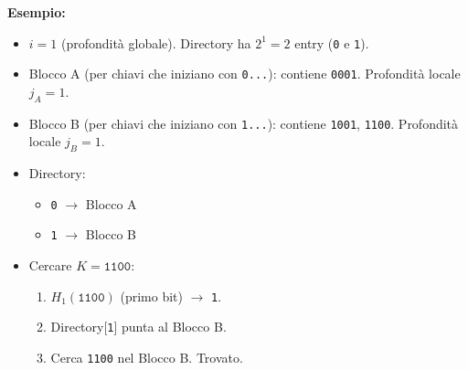 \textbf{Esempio:}
\begin{itemize}
    \item $i = 1$ (profondità globale). Directory ha $2^1 = 2$ entry (\texttt{0} e \texttt{1}).
    \item Blocco A (per chiavi che iniziano con \texttt{0...}): contiene \texttt{0001}. Profondità locale $j_A = 1$.
    \item Blocco B (per chiavi che iniziano con \texttt{1...}): contiene \texttt{1001}, \texttt{1100}. Profondità locale $j_B = 1$.
    \item Directory:
    \begin{itemize}
        \item \texttt{0} $\rightarrow$ Blocco A
        \item \texttt{1} $\rightarrow$ Blocco B
    \end{itemize}
    \item Cercare $K = \texttt{1100}$:
    \begin{enumerate}
        \item $H_1(\texttt{1100})$ (primo bit) $\rightarrow$ \texttt{1}.
        \item Directory[\texttt{1}] punta al Blocco B.
        \item Cerca \texttt{1100} nel Blocco B. Trovato.
    \end{enumerate}
\end{itemize}

